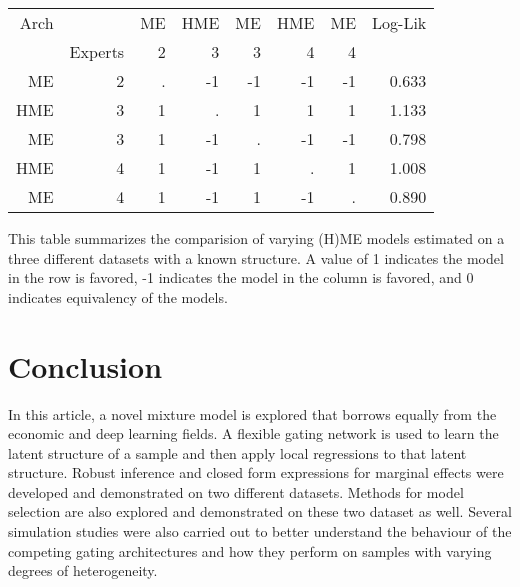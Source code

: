 \documentclass[12pt]{article}
\theoremstyle{definition}
\begin{document}
\begin{table}[t!]
\begin{threeparttable}
\begin{tabular}[l]{r r r r r r r r}
      \hline
      Arch    &         & ME    & HME   & ME    & HME   & ME  & Log-Lik \\
              & Experts & 2     & 3     & 3     & 4     & 4   &         \\
      \hline
      ME      & 2       & .     & -1    & -1    & -1    & -1  & 0.633   \\
      HME     & 3       & 1     & .     & 1     &  1    & 1   & 1.133   \\
      ME      & 3       & 1     & -1    & .     & -1    & -1  & 0.798   \\
      HME     & 4       & 1     & -1    & 1     & .     & 1   & 1.008   \\
      ME      & 4       & 1     & -1    & 1     & -1    & .   & 0.890   \\
      \hline
    \end{tabular}
    \begin{tablenotes}
      \item{\footnotesize This table summarizes the comparision of varying (H)ME models estimated on a three different datasets with a known structure. A value of 1 indicates the model in the row is favored, -1 indicates the model in the column is favored, and 0 indicates equivalency of the models.}
    \end{tablenotes} \label{tbl:monte_carlo_voung_results}
  \end{threeparttable}
\end{table}

\clearpage

\section{Conclusion} \label{sec:Conclusion}

In this article, a novel mixture model is explored that borrows equally from the economic and deep learning fields. A flexible gating network is used to learn the latent structure of a sample and then apply local regressions to that latent structure. Robust inference and closed form expressions for marginal effects were developed and demonstrated on two different datasets. Methods for model selection are also explored and demonstrated on these two dataset as well. Several simulation studies were also carried out to better understand the behaviour of the competing gating architectures and how they perform on samples with varying degrees of heterogeneity.



\clearpage

\printbibliography
\end{document}
